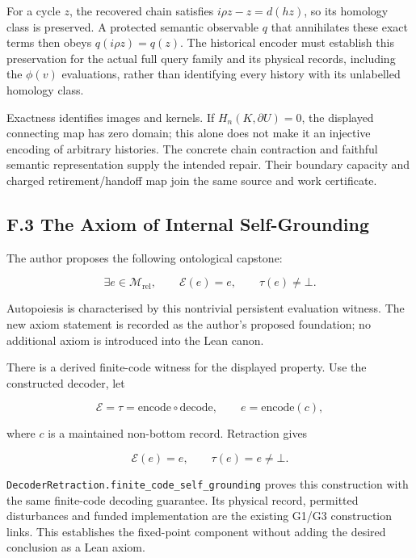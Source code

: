 \documentclass[
]{article}
\begin{document}
For a cycle \(z\), the recovered chain satisfies \(i\rho z-z=d(hz)\), so
its homology class is preserved. A protected semantic observable \(q\)
that annihilates these exact terms then obeys \(q(i\rho z)=q(z)\). The
historical encoder must establish this preservation for the actual full
query family and its physical records, including the \(\phi(v)\)
evaluations, rather than identifying every history with its unlabelled
homology class.

Exactness identifies images and kernels. If \(H_n(K,\partial U)=0\), the
displayed connecting map has zero domain; this alone does not make it an
injective encoding of arbitrary histories. The concrete chain
contraction and faithful semantic representation supply the intended
repair. Their boundary capacity and charged
r\allowbreak{}e\allowbreak{}t\allowbreak{}i\allowbreak{}r\allowbreak{}e\allowbreak{}m\allowbreak{}e\allowbreak{}n\allowbreak{}t\allowbreak{}/\allowbreak{}h\allowbreak{}a\allowbreak{}n\allowbreak{}d\allowbreak{}o\allowbreak{}f\allowbreak{}f
map join the same source and work certificate.

\subsection{F.3 The Axiom of Internal
Self-Grounding}\label{f.3-the-axiom-of-internal-self-grounding}

The author proposes the following ontological capstone:

\[
\exists e\in\mathcal M_{\mathrm{rel}},\qquad
\mathcal E(e)=e,\qquad \tau(e)\ne\bot.
\]

Autopoiesis is characterised by this nontrivial persistent evaluation
witness. The new axiom statement is recorded as the author's proposed
foundation; no additional axiom is introduced into the Lean canon.

There is a derived finite-code witness for the displayed property. Use
the constructed decoder, let

\[
\mathcal E=\tau=\mathrm{encode}\circ\mathrm{decode},
\qquad e=\mathrm{encode}(c),
\]

where \(c\) is a maintained non-bottom record. Retraction gives

\[
\mathcal E(e)=e,\qquad \tau(e)=e\ne\bot.
\]

\texttt{D\allowbreak{}e\allowbreak{}c\allowbreak{}o\allowbreak{}d\allowbreak{}e\allowbreak{}r\allowbreak{}R\allowbreak{}e\allowbreak{}t\allowbreak{}r\allowbreak{}a\allowbreak{}c\allowbreak{}t\allowbreak{}i\allowbreak{}o\allowbreak{}n\allowbreak{}.\allowbreak{}f\allowbreak{}i\allowbreak{}n\allowbreak{}i\allowbreak{}t\allowbreak{}e\allowbreak{}\_\allowbreak{}c\allowbreak{}o\allowbreak{}d\allowbreak{}e\allowbreak{}\_\allowbreak{}s\allowbreak{}e\allowbreak{}l\allowbreak{}f\allowbreak{}\_\allowbreak{}g\allowbreak{}r\allowbreak{}o\allowbreak{}u\allowbreak{}n\allowbreak{}d\allowbreak{}i\allowbreak{}n\allowbreak{}g}
proves this construction with the same finite-code decoding guarantee.
Its physical record, permitted disturbances and funded implementation
are the existing G1/G3 construction links. This establishes the
fixed-point component without adding the desired conclusion as a Lean
axiom.
\end{document}
